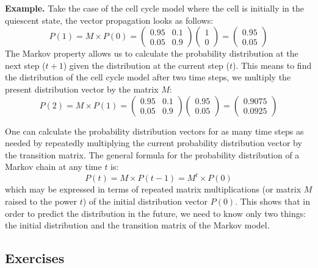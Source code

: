 \documentclass[
  letterpaper,
  DIV=11,
  numbers=noendperiod]{scrreprt}
\begin{document}
\textbf{Example.} Take the case of the cell cycle model where the cell
is initially in the quiescent state, the vector propagation looks as
follows:
\[ P(1) = M \times  P(0) = \left(\begin{array}{cc}0.95 & 0.1 \\0.05 & 0.9\end{array}\right)  \left(\begin{array}{c}1  \\ 0\end{array}\right) = \left(\begin{array}{c} 0.95 \\ 0.05\end{array}\right) \]
The Markov property allows us to calculate the probability distribution
at the next step (\(t+1\)) given the distribution at the current step
(\(t\)). This means to find the distribution of the cell cycle model
after two time steps, we multiply the present distribution vector by the
matrix \(M\):
\[ P(2) = M   \times  P(1) =  \left(\begin{array}{cc}0.95 & 0.1 \\0.05 & 0.9\end{array}\right)\left(\begin{array}{c} 0.95 \\ 0.05\end{array}\right) = \left(\begin{array}{c} 0.9075 \\ 0.0925\end{array}\right) \]

One can calculate the probability distribution vectors for as many time
steps as needed by repeatedly multiplying the current probability
distribution vector by the transition matrix. The general formula for
the probability distribution of a Markov chain at any time \(t\) is: \[
P(t) = M \times P(t-1) = M^{t}  \times  P(0)
\label{eq:Markov_chain}
\] which may be expressed in terms of repeated matrix multiplications
(or matrix \(M\) raised to the power \(t\)) of the initial distribution
vector \(P(0)\). This shows that in order to predict the distribution in
the future, we need to know only two things: the initial distribution
and the transition matrix of the Markov model.

\hypertarget{exercises-29}{%
\subsection{Exercises}\label{exercises-29}}
\end{document}
